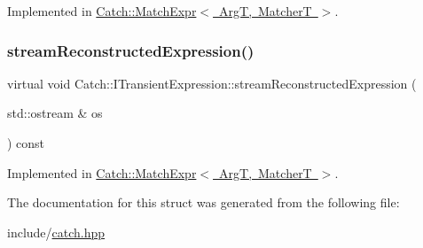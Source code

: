 Implemented in \mbox{\hyperlink{classCatch_1_1MatchExpr_a932628935e0b257fcccec3d9cad58ffe}{Catch\+::\+Match\+Expr$<$ Arg\+T, Matcher\+T $>$}}.

\mbox{\label{structCatch_1_1ITransientExpression_aabe1889df9c6e639a24afb08d8a0fe9e}} 
\subsubsection{\texorpdfstring{stream\+Reconstructed\+Expression()}{streamReconstructedExpression()}}
{\footnotesize\ttfamily virtual void Catch\+::\+I\+Transient\+Expression\+::stream\+Reconstructed\+Expression (\begin{DoxyParamCaption}\item[{std\+::ostream \&}]{os }\end{DoxyParamCaption}) const\hspace{0.3cm}{\ttfamily [pure virtual]}}



Implemented in \mbox{\hyperlink{classCatch_1_1MatchExpr_ad3e41adb597750b2219bb37e51185629}{Catch\+::\+Match\+Expr$<$ Arg\+T, Matcher\+T $>$}}.



The documentation for this struct was generated from the following file\+:\begin{DoxyCompactItemize}
\item 
include/\mbox{\hyperlink{catch_8hpp}{catch.\+hpp}}\end{DoxyCompactItemize}
